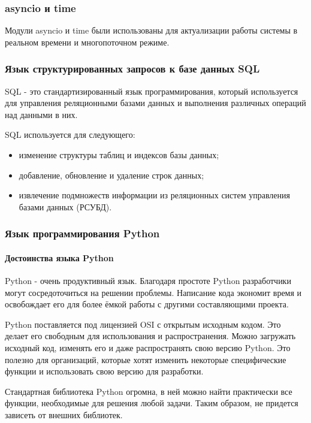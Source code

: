 \subsubsection {asyncio и time}
Модули asyncio и time были использованы для актуализации работы системы в реальном времени и многопоточном режиме.


\subsubsection{Язык структурированных запросов к базе данных SQL}
SQL - это стандартизированный язык программирования, который используется для управления реляционными базами данных и выполнения различных операций над данными в них. 

SQL используется для следующего:
\begin{itemize}
	\item изменение структуры таблиц и индексов базы данных;
	\item добавление, обновление и удаление строк данных;
	\item извлечение подмножеств информации из реляционных систем управления базами данных (РСУБД).
\end{itemize}


\subsubsection{Язык программирования Python}

\paragraph{Достоинства языка Python}
Python - очень продуктивный язык. Благодаря простоте Python разработчики могут сосредоточиться на решении проблемы. Написание кода экономит время и освобождает его для более ёмкой работы с другими составляющими проекта.

Python поставляется под лицензией OSI с открытым исходным кодом. Это делает его свободным для использования и распространения. Можно загружать исходный код, изменять его и даже распространять свою версию Python. Это полезно для организаций, которые хотят изменить некоторые специфические функции и использовать свою версию для разработки.

Стандартная библиотека Python огромна, в ней можно найти практически все функции, необходимые для решения любой задачи. Таким образом, не придется зависеть от внешних библиотек.


